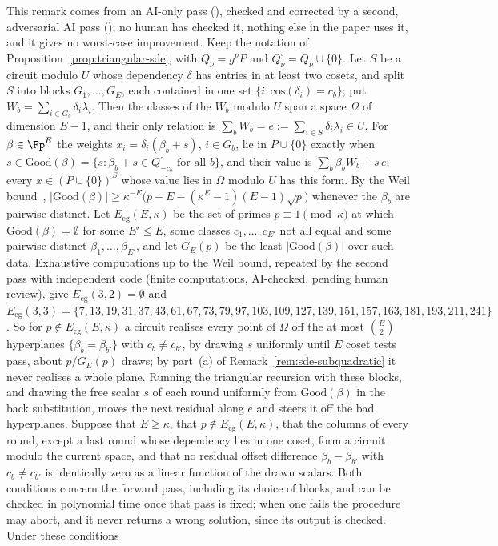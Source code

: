 
\begin{remark}
\label{rem:sde-block-steered}
This remark comes from an AI-only pass (), checked and corrected by a second, adversarial AI pass (); no human has checked it, nothing else in the paper uses it, and it gives no worst-case improvement. Keep the notation of Proposition~\ref{prop:triangular-sde}, with $Q_\nu=g^{\nu}P$ and $Q_\nu^\circ=Q_\nu\cup\{0\}$. Let $S$ be a circuit modulo $U$ whose dependency $\delta$ has entries in at least two cosets, and split $S$ into blocks $G_1,\dots,G_E$, each contained in one set $\{i:\mathrm{cos}(\delta_i)=c_b\}$; put $W_b=\sum_{i\in G_b}\delta_i\lambda_i$. Then the classes of the $W_b$ modulo $U$ span a space $\Omega$ of dimension $E-1$, and their only relation is $\sum_bW_b=e:=\sum_{i\in S}\delta_i\lambda_i\in U$. For $\beta\in\Fp^E$ the weights $x_i=\delta_i(\beta_b+s)$, $i\in G_b$, lie in $P\cup\{0\}$ exactly when $s\in\mathrm{Good}(\beta)=\{s:\beta_b+s\in Q_{-c_b}^\circ\text{ for all }b\}$, and their value is $\sum_b\beta_bW_b+s\,e$; every $x\in(P\cup\{0\})^S$ whose value lies in $\Omega$ modulo $U$ has this form. By the Weil bound~\cite[Theorem~5.41]{LidlNiederreiter1997}, $|\mathrm{Good}(\beta)|\ge\kappa^{-E}\bigl(p-E-(\kappa^E-1)(E-1)\sqrt p\bigr)$ whenever the $\beta_b$ are pairwise distinct. Let $E_{\mathrm{cg}}(E,\kappa)$ be the set of primes $p\equiv1\pmod\kappa$ at which $\mathrm{Good}(\beta)=\emptyset$ for some $E'\le E$, some classes $c_1,\dots,c_{E'}$ not all equal and some pairwise distinct $\beta_1,\dots,\beta_{E'}$, and let $G_E(p)$ be the least $|\mathrm{Good}(\beta)|$ over such data. Exhaustive computations up to the Weil bound, repeated by the second pass with independent code (finite computations, AI-checked, pending human review), give $E_{\mathrm{cg}}(3,2)=\emptyset$ and $E_{\mathrm{cg}}(3,3)=\{7,13,19,31,37,43,61,67,73,79,97,103,109,127,139,151,157,163,181,193,211,241\}$. So for $p\notin E_{\mathrm{cg}}(E,\kappa)$ a circuit realises every point of $\Omega$ off the at most $\binom{E}{2}$ hyperplanes $\{\beta_b=\beta_{b'}\}$ with $c_b\ne c_{b'}$, by drawing $s$ uniformly until $E$ coset tests pass, about $p/G_E(p)$ draws; by part~(a) of Remark~\ref{rem:sde-subquadratic} it never realises a whole plane. Running the triangular recursion with these blocks, and drawing the free scalar $s$ of each round uniformly from $\mathrm{Good}(\beta)$ in the back substitution, moves the next residual along $e$ and steers it off the bad hyperplanes. Suppose that $E\ge\kappa$, that $p\notin E_{\mathrm{cg}}(E,\kappa)$, that the columns of every round, except a last round whose dependency lies in one coset, form a circuit modulo the current space, and that no residual offset difference $\beta_b-\beta_{b'}$ with $c_b\ne c_{b'}$ is identically zero as a linear function of the drawn scalars. Both conditions concern the forward pass, including its choice of blocks, and can be checked in polynomial time once that pass is fixed; when one fails the procedure may abort, and it never returns a wrong solution, since its output is checked. Under these conditions 
\end{remark}
